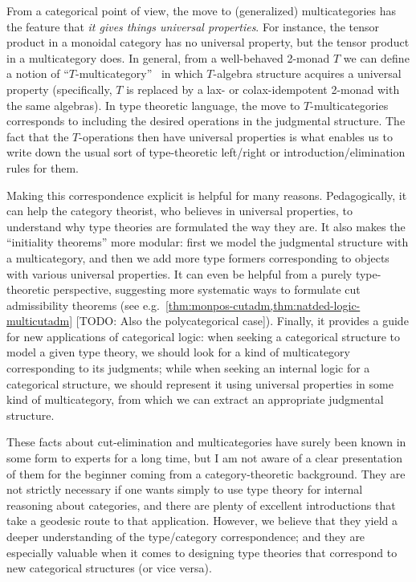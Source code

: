 \documentclass{book}
\begin{document}
From a categorical point of view, the move to (generalized) multicategories has the feature that \emph{it gives things universal properties}.
For instance, the tensor product in a monoidal category has no universal property, but the tensor product in a multicategory does.
In general, from a well-behaved 2-monad $T$ we can define a notion of ``$T$-multicategory''~\cite{burroni:t-cats,leinster:higher-opds,hermida:coh-univ,cs:multicats} in which $T$-algebra structure acquires a universal property (specifically, $T$ is replaced by a lax- or colax-idempotent 2-monad with the same algebras).
In type theoretic language, the move to $T$-multicategories corresponds to including the desired operations in the judgmental structure.
The fact that the $T$-operations then have universal properties is what enables us to write down the usual sort of type-theoretic left/right or introduction/elimination rules for them.

Making this correspondence explicit is helpful for many reasons.
Pedagogically, it can help the category theorist, who believes in universal properties, to understand why type theories are formulated the way they are.
It also makes the ``initiality theorems'' more modular: first we model the judgmental structure with a multicategory, and then we add more type formers corresponding to objects with various universal properties.
It can even be helpful from a purely type-theoretic perspective, suggesting more systematic ways to formulate cut admissibility theorems (see e.g.\ \cref{thm:monpos-cutadm,thm:natded-logic-multicutadm} [TODO: Also the polycategorical case]).
Finally, it provides a guide for new applications of categorical logic: when seeking a categorical structure to model a given type theory, we should look for a kind of multicategory corresponding to its judgments; while when seeking an internal logic for a categorical structure, we should represent it using universal properties in some kind of multicategory, from which we can extract an appropriate judgmental structure.

These facts about cut-elimination and multicategories have surely been known in some form to experts for a long time, but I am not aware of a clear presentation of them for the beginner coming from a category-theoretic background.
They are not strictly necessary if one wants simply to use type theory for internal reasoning about categories, and there are plenty of excellent introductions that take a geodesic route to that application.
However, we believe that they yield a deeper understanding of the type/category correspondence; and they are especially valuable when it comes to designing type theories that correspond to new categorical structures (or vice versa).
\end{document}
